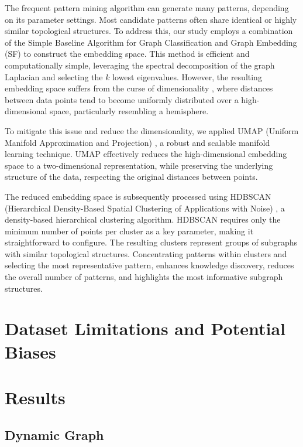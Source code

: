 \documentclass[12pt]{article}
\begin{document}
The frequent pattern mining algorithm can generate many patterns, depending on its parameter settings. Most candidate patterns often share identical or highly similar topological structures. To address this, our study employs a combination of the Simple Baseline Algorithm for Graph Classification and Graph Embedding (SF) \cite{de2018simple} to construct the embedding space. This method is efficient and computationally simple, leveraging the spectral decomposition of the graph Laplacian and selecting the $k$ lowest eigenvalues. However, the resulting embedding space suffers from the curse of dimensionality \cite{zaki2020data}, where distances between data points tend to become uniformly distributed over a high-dimensional space, particularly resembling a hemisphere.

To mitigate this issue and reduce the dimensionality, we applied UMAP (Uniform Manifold Approximation and Projection) \cite{mcinnes2018umap}, a robust and scalable manifold learning technique. UMAP effectively reduces the high-dimensional embedding space to a two-dimensional representation, while preserving the underlying structure of the data, respecting the original distances between points.

The reduced embedding space is subsequently processed using HDBSCAN (Hierarchical Density-Based Spatial Clustering of Applications with Noise) \cite{campello2013density}, a density-based hierarchical clustering algorithm. HDBSCAN requires only the minimum number of points per cluster as a key parameter, making it straightforward to configure. The resulting clusters represent groups of subgraphs with similar topological structures. Concentrating patterns within clusters and selecting the most representative pattern, enhances knowledge discovery, reduces the overall number of patterns, and highlights the most informative \cite{SciPyProceedings_11} subgraph structures.

\section{Dataset Limitations and Potential Biases}
\section{Results}
\subsection{Dynamic Graph}
\end{document}
